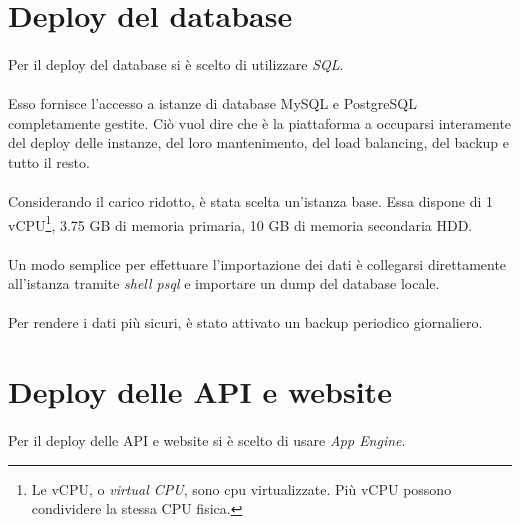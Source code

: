 \documentclass[12pt,a4paper,twoside,english,italian]{book}
\begin{document}
\section{Deploy del database}

\paragraph{} Per il deploy del database si è scelto di utilizzare \emph{SQL}. 

\paragraph{} Esso fornisce l'accesso a istanze di database MySQL e PostgreSQL completamente gestite. Ciò vuol dire che è la piattaforma a occuparsi interamente del deploy delle instanze, del loro mantenimento, del load balancing, del backup e tutto il resto. 

\paragraph{} Considerando il carico ridotto, è stata scelta un'istanza base. Essa dispone di 1 vCPU\footnote{Le vCPU, o \emph{virtual CPU}, sono cpu virtualizzate. Più vCPU possono condividere la stessa CPU fisica.}, 3.75 GB di memoria primaria, 10 GB di memoria secondaria HDD.

\paragraph{} Un modo semplice per effettuare l'importazione dei dati è collegarsi direttamente all'istanza tramite \emph{shell psql} e importare un dump del database locale. 
\paragraph{} Per rendere i dati più sicuri, è stato attivato un backup periodico giornaliero.

\section{Deploy delle API e website}

\paragraph{} Per il deploy delle API e website si è scelto di usare \emph{App Engine}.
\end{document}
